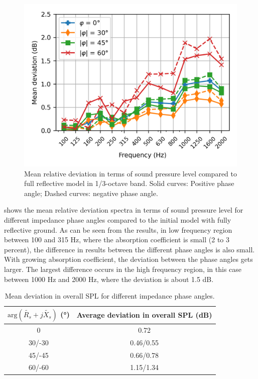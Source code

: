 \begin{figure}[H]
	\centering
	\includegraphics[width=0.7\linewidth]{fig/chap5/impedance/freq_spectrum/average_gap.png}
	\caption{Mean relative deviation in terms of sound pressure level compared to full reflective model in 1/3-octave band. Solid curves: Positive phase angle; Dashed curves: negative phase angle.}
	\label{fig:gap_freq_spectrum_impedance}
\end{figure}

\noindent{} shows the mean relative deviation spectra in terms of sound pressure level for different impedance phase angles compared to the initial model with fully reflective ground. As can be seen from the results, in low frequency region between 100 and 315 Hz, where the absorption coefficient is small (2 to 3 percent), the difference in results between the different phase angles is also small. With growing absorption coefficient, the deviation between the phase angles gets larger. The largest difference occurs in the high frequency region, in this case between 1000 Hz and 2000 Hz, where the deviation is about 1.5 dB.

\begin{table}[H]
	\centering
	\caption{Mean deviation in overall SPL for different impedance phase angles.}
	\label{tab:mean_devaition_impedance}
	\begin{tabular}{cc}
		\toprule
		$\text{arg}(\tilde{R_s} + j\tilde{X_s})$ (°) & Average deviation in overall SPL (dB) \\
		\midrule
		0                         & 0.72                                      \\
		30/-30                    & 0.46/0.55                                 \\
		45/-45                    & 0.66/0.78                                 \\
		60/-60                    & 1.15/1.34                                 \\
		\bottomrule
	\end{tabular}
\end{table}

